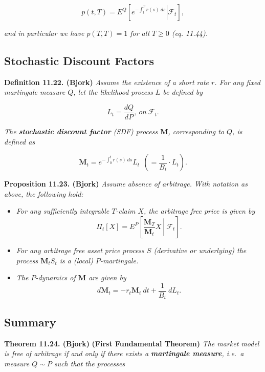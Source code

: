 \documentclass[a4paper,12pt,openany]{book}
\providecommand{\tightlist}{%
 \setlength{\itemsep}{0pt}\setlength{\parskip}{0pt}}
\begin{document}
\[
p(t,T)=E^Q\left[\left.e^{-\int_t^Tr(s)\ ds}\right\vert \mathcal{F}_t\right],\tag{11.43}
\]

\emph{and in particular we have \(p(T,T)=1\) for all \(T\ge 0\) (eq. 11.44).}

\hypertarget{stochastic-discount-factors-1}{%
\subsection{Stochastic Discount Factors}\label{stochastic-discount-factors-1}}

\textbf{Definition 11.22. (Bjork)} \emph{Assume the existence of a short rate \(r\). For any fixed martingale measure \(Q\), let the likelihood process \(L\) be defined by}

\[
L_t=\frac{dQ}{dP},\ on\ \mathcal{F}_t.\tag{11.48}
\]

\emph{The \textbf{stochastic discount factor} (SDF) process \(\mathbf{M}\), corresponding to \(Q\), is defined as}

\[
\mathbf{M}_t=e^{-\int_0^tr(s)\ ds}L_t\ \ \left(=\frac{1}{B_t}\cdot L_t\right).\tag{11.49/50}
\]

\textbf{Proposition 11.23. (Bjork)} \emph{Assume absence of arbitrage. With notation as above, the following hold:}

\begin{itemize}
\tightlist
\item
  \emph{For any sufficiently integrable \(T\)-claim \(X\), the arbitrage free price is given by}
  \[
    \Pi_t[X]=E^P\left[\left. \frac{\mathbf{M}_T}{\mathbf{M}_t} X \ \right\vert\ \mathcal{F}_t\right].\tag{11.51}
    \]
\item
  \emph{For any arbitrage free asset price process \(S\) (derivative or underlying) the process \(\mathbf{M}_tS_t\) is a (local) \(P\)-martingale.}
\item
  \emph{The \(P\)-dynamics of \(\mathbf{M}\) are given by}
  \[
    d\mathbf{M}_t=-r_t\mathbf{M}_t\ dt+\frac{1}{B_t}\ dL_t.\tag{11.53}
    \]
\end{itemize}

\hypertarget{summary}{%
\subsection{Summary}\label{summary}}

\textbf{Theorem 11.24. (Bjork)} \textbf{(First Fundamental Theorem)} \emph{The market model is free of arbitrage if and only if there exists a \textbf{martingale measure}, i.e.~a measure \(Q\sim P\) such that the processes}
\end{document}
